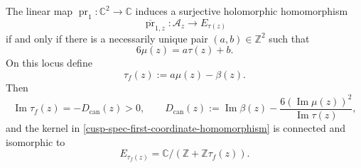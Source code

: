 \begin{proposition}
\label{cusp-spec-first-coordinate-descent}
The linear map
\(\operatorname{pr}_1:\mathbb C^2\to\mathbb C\) induces a surjective
holomorphic homomorphism
\begin{equation}
 \overline{\operatorname{pr}}_{1,z}:\mathcal A_z\longrightarrow
 E_{\tau(z)}
 \label{cusp-spec-first-coordinate-homomorphism}
\end{equation}
if and only if there is a necessarily unique pair
\((a,b)\in\mathbb Z^2\) such that
\begin{equation}
 6\mu(z)=a\tau(z)+b.
 \label{cusp-spec-first-coordinate-condition}
\end{equation}
On this locus define
\begin{equation}
 \tau_f(z):=a\mu(z)-\beta(z).
 \label{cusp-spec-kernel-period}
\end{equation}
Then
\begin{equation}
 \operatorname{Im}\tau_f(z)
 =-D_{\mathrm{can}}(z)>0,
 \qquad
 D_{\mathrm{can}}(z):=\operatorname{Im}\beta(z)
 -\frac{6(\operatorname{Im}\mu(z))^2}{\operatorname{Im}\tau(z)},
 \label{cusp-spec-kernel-period-imaginary-part}
\end{equation}
and the kernel in \cref{cusp-spec-first-coordinate-homomorphism} is connected
and isomorphic to
\begin{equation}
 E_{\tau_f(z)}=\mathbb C/(\mathbb Z+\mathbb Z\tau_f(z)).
 \label{cusp-spec-connected-kernel-elliptic-curve}
\end{equation}
\end{proposition}

